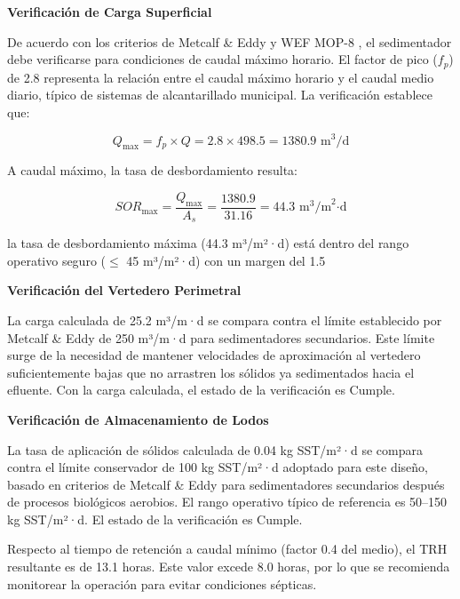 \documentclass[12pt,a4paper]{article}
\begin{document}
\textbf{Verificación de Carga Superficial}

De acuerdo con los criterios de Metcalf \& Eddy \cite{metcalf2014} y WEF MOP-8 \cite{wef_mop8_2010}, el sedimentador debe verificarse para condiciones de caudal máximo horario. El factor de pico ($f_p$) de 2.8 representa la relación entre el caudal máximo horario y el caudal medio diario, típico de sistemas de alcantarillado municipal. La verificación establece que:

\begin{equation}
Q_{\max} = f_p \times Q = 2.8 \times 498.5 = 1380.9 \text{ m}^3\text{/d}
\end{equation}

A caudal máximo, la tasa de desbordamiento resulta:

\begin{equation}
SOR_{\max} = \frac{Q_{\max}}{A_s} = \frac{1380.9}{31.16} = 44.3 \text{ m}^3\text{/m}^2\text{·d}
\end{equation}

la tasa de desbordamiento máxima (44.3 m³/m²·d) está dentro del rango operativo seguro ($\leq$ 45 m³/m²·d) con un margen del 1.5%

\textbf{Verificación del Vertedero Perimetral}

La carga calculada de 25.2 m³/m·d se compara contra el límite establecido por Metcalf & Eddy de 250 m³/m·d para sedimentadores secundarios. Este límite surge de la necesidad de mantener velocidades de aproximación al vertedero suficientemente bajas que no arrastren los sólidos ya sedimentados hacia el efluente. Con la carga calculada, el estado de la verificación es Cumple.

\textbf{Verificación de Almacenamiento de Lodos}

La tasa de aplicación de sólidos calculada de 0.04 kg SST/m²·d se compara contra el límite conservador de 100 kg SST/m²·d adoptado para este diseño, basado en criterios de Metcalf & Eddy para sedimentadores secundarios después de procesos biológicos aerobios. El rango operativo típico de referencia es 50--150 kg SST/m²·d. El estado de la verificación es Cumple.

Respecto al tiempo de retención a caudal mínimo (factor 0.4 del medio), el TRH resultante es de 13.1 horas. Este valor excede 8.0 horas, por lo que se recomienda monitorear la operación para evitar condiciones sépticas.
\end{document}

